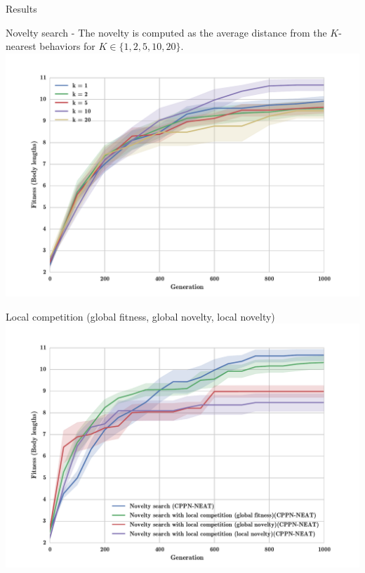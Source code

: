 \documentclass{beamer}
\begin{document}
\begin{frame}[allowframebreaks]{Results}
\begin{minipage}{\textwidth}
\begin{block}{Novelty search - The novelty is computed as the average distance from the $K$-nearest behaviors for $K \in \lbrace 1,2,5,10,20 \rbrace $.}
\includegraphics[width=1.0\textwidth]{figures/results/KnnExperimentSize5.pdf}
\end{block}
\end{minipage}

\begin{minipage}{\textwidth}
\begin{block}{Local competition (global fitness, global novelty, local novelty)}
\includegraphics[width=1.0\textwidth]{figures/results/NoveltyCompetitionsSize5.pdf}
\end{block}
\end{minipage}


\end{frame}
\end{document}
